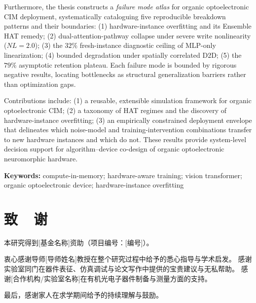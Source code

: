 Furthermore, the thesis constructs a \emph{failure mode atlas} for organic optoelectronic CIM deployment,
systematically cataloguing five reproducible breakdown patterns and their boundaries:
(1) hardware-instance overfitting and its Ensemble HAT remedy;
(2) dual-attention-pathway collapse under severe write nonlinearity ($NL=2.0$);
(3) the $32\%$ fresh-instance diagnostic ceiling of MLP-only linearization;
(4) bounded degradation under spatially correlated D2D;
(5) the $79\%$ asymptotic retention plateau.
Each failure mode is bounded by rigorous negative results, locating bottlenecks as structural generalization barriers rather than optimization gaps.

Contributions include:
(1) a reusable, extensible simulation framework for organic optoelectronic CIM;
(2) a taxonomy of HAT regimes and the discovery of hardware-instance overfitting;
(3) an empirically constrained deployment envelope that delineates which noise-model and training-intervention combinations transfer to new hardware instances and which do not.
These results provide system-level decision support for algorithm--device co-design of organic optoelectronic neuromorphic hardware.

\vspace{1em}
\noindent\textbf{Keywords:} compute-in-memory; hardware-aware training; vision transformer; organic optoelectronic device; hardware-instance overfitting

\vspace{2em}

\chapter*{致\ \ 谢}

本研究得到[基金名称]资助（项目编号：[编号]）。

衷心感谢导师[导师姓名]教授在整个研究过程中给予的悉心指导与学术启发。
感谢实验室同门在器件表征、仿真调试与论文写作中提供的宝贵建议与无私帮助。
感谢[合作机构/实验室名称]在有机光电子器件制备与测量方面的支持。

最后，感谢家人在求学期间给予的持续理解与鼓励。

\vspace{2em}
\noindent
[作者姓名]\\
[日期]
